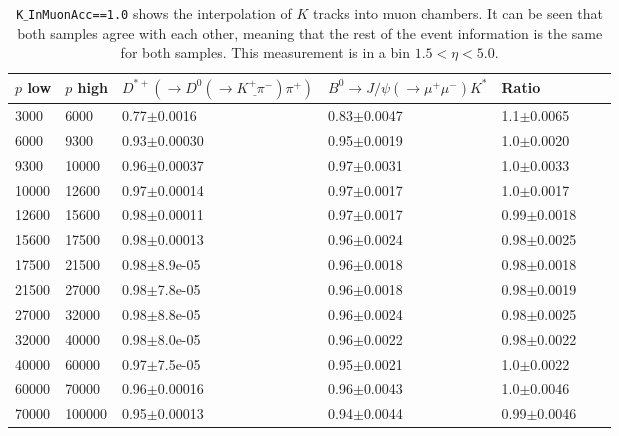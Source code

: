 \begin{table}[h!]
\small
\begin{center}
\begin{tabular}{| l | l | l | l | l | l | l |}
\hline
	$p$ low & $p$ high & $D^{*+}(\rightarrow D^{0}(\rightarrow \underline{K^{+} \pi^{-}}) \pi^{+})$  & $B^{0} \rightarrow J/\psi(\rightarrow \mu^{+} \mu^{-}) K^{*}$  & Ratio  \\ \hline
3000 & 6000 &   0.77$\pm$0.0016 & 0.83$\pm$0.0047 & 1.1$\pm$0.0065 \\
6000 & 9300 &   0.93$\pm$0.00030 & 0.95$\pm$0.0019 & 1.0$\pm$0.0020 \\
9300 & 10000 &  0.96$\pm$0.00037 & 0.97$\pm$0.0031 & 1.0$\pm$0.0033 \\
10000 & 12600 &  0.97$\pm$0.00014 & 0.97$\pm$0.0017 & 1.0$\pm$0.0017 \\
12600 & 15600 &   0.98$\pm$0.00011 & 0.97$\pm$0.0017 & 0.99$\pm$0.0018 \\
15600 & 17500 &   0.98$\pm$0.00013 & 0.96$\pm$0.0024 & 0.98$\pm$0.0025 \\
17500 & 21500 &   0.98$\pm$8.9e-05 & 0.96$\pm$0.0018 & 0.98$\pm$0.0018 \\
21500 & 27000 &   0.98$\pm$7.8e-05 & 0.96$\pm$0.0018 & 0.98$\pm$0.0019 \\
27000 & 32000 &   0.98$\pm$8.8e-05 & 0.96$\pm$0.0024 & 0.98$\pm$0.0025 \\
32000 & 40000 &  0.98$\pm$8.0e-05 & 0.96$\pm$0.0022 & 0.98$\pm$0.0022 \\
40000 & 60000 &  0.97$\pm$7.5e-05 & 0.95$\pm$0.0021 & 1.0$\pm$0.0022 \\
60000 & 70000 &  0.96$\pm$0.00016 & 0.96$\pm$0.0043 & 1.0$\pm$0.0046 \\
70000 & 100000 &  0.95$\pm$0.00013 & 0.94$\pm$0.0044 & 0.99$\pm$0.0046 \\
\hline

\end{tabular}
\end{center}
\caption{\texttt{K$\_$InMuonAcc==1.0} shows the interpolation of $K$ tracks into muon chambers. It can be seen that both samples agree with each other, meaning that the rest of the event information is the same for both samples. This measurement is in a bin $1.5<\eta<5.0$.}
\label{tab:ROE}
\end{table}


